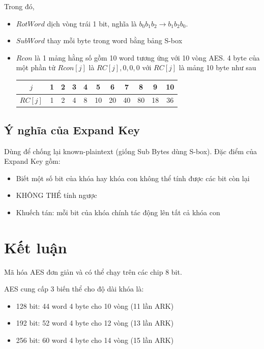 \documentclass[a5paper]{article}
\begin{document}
    Trong đó, 
    \begin{itemize}
        \item $RotWord$ dịch vòng trái 1 bit, nghĩa là $b_0 b_1 b_2 \rightarrow b_1 b_2 b_0$.
        \item $SubWord$ thay mỗi byte trong word bằng bảng S-box
        \item $Rcon$ là 1 mảng hằng số gồm 10 word tương ứng với 10 vòng AES. 4 byte của một phần tử $Rcon[j]$ là $RC[j], 0, 0, 0$ với $RC[j]$ là mảng 10 byte như sau
        \begin{center}
            \begin{tabular}{|c|c|c|c|c|c|c|c|c|c|c|}
                \hline
                $j$ & 1 & 2 & 3 & 4 & 5 & 6 & 7 & 8 & 9 & 10 \\
                \hline
                $RC[j]$ & 1 & 2 & 4 & 8 & 10 & 20 & 40 & 80 & 18 & 36 \\
                \hline
            \end{tabular}
        \end{center}
        
    \end{itemize}

    \subsection{Ý nghĩa của Expand Key}

    Dùng để chống lại known-plaintext (giống Sub Bytes dùng S-box). Đặc điểm của Expand Key gồm:

    \begin{itemize}
        \item Biết một số bit của khóa hay khóa con không thể tính được các bit còn lại
        \item KHÔNG THỂ tính ngược
        \item Khuếch tán: mỗi bit của khóa chính tác động lên tất cả khóa con
    \end{itemize}

    \section{Kết luận}

    Mã hóa AES đơn giản và có thể chạy trên các chip 8 bit.

    AES cung cấp 3 biến thể cho độ dài khóa là:

    \begin{itemize}
        \item 128 bit: 44 word 4 byte cho 10 vòng (11 lần ARK)
        \item 192 bit: 52 word 4 byte cho 12 vòng (13 lần ARK)
        \item 256 bit: 60 word 4 byte cho 14 vòng (15 lần ARK)
    \end{itemize}
\end{document}
